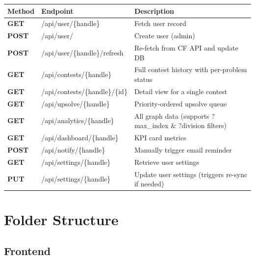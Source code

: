 \documentclass[11pt, a4paper]{article}
\begin{document}
\begin{center}
\begin{tabularx}{0.97\linewidth}{>{\ttfamily\bfseries\color{accentwarm}}l >{\ttfamily\color{accent}}l X}
\toprule
\rowcolor{bgaccent}
\color{textsecondary}Method &\color{textsecondary}Endpoint &\color{textsecondary}Description \\
\midrule
GET  & /api/user/\{handle\}              & Fetch user record \\
POST & /api/user/                         & Create user (admin) \\
POST & /api/user/\{handle\}/refresh      & Re-fetch from CF API and update DB \\
GET  & /api/contests/\{handle\}          & Full contest history with per-problem status \\
GET  & /api/contests/\{handle\}/\{id\}   & Detail view for a single contest \\
GET  & /api/upsolve/\{handle\}           & Priority-ordered upsolve queue \\
GET  & /api/analytics/\{handle\}         & All graph data (supports ?max\_index \& ?division filters) \\
GET  & /api/dashboard/\{handle\}         & KPI card metrics \\
POST & /api/notify/\{handle\}            & Manually trigger email reminder \\
GET  & /api/settings/\{handle\}          & Retrieve user settings \\
PUT  & /api/settings/\{handle\}          & Update user settings (triggers re-sync if needed) \\
\bottomrule
\end{tabularx}
\end{center}

\section{Folder Structure}

\subsection{Frontend}
\end{document}
